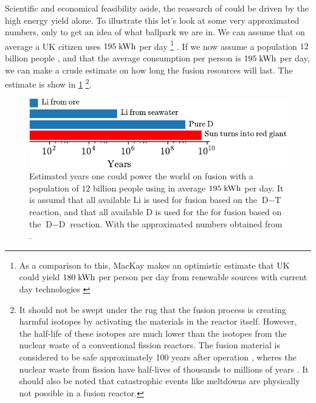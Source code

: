 Scientific and economical feasibility aside, the reasearch of could be driven by the high energy yield alone.
To illustrate this let's look at some very approximated numbers, only to get an idea of what ballpark we are in.
We can assume that on average a UK citizen uses $195 \text{\;kWh}$ per day%
\footnote{As a comparison to this, MacKay makes an optimistic estimate that UK could yield $180 \text{\;kWh}$ per person per day from renewable sources with current day technologies \cite{Mackay2009book}}%
%
\cite{Mackay2009book}.
If we now assume a population $12$ billion people \cite{Melorose2015}, and that the average consumption per person is $195 \text{\;kWh}$ per day, we can make a crude estimate on how long the fusion resources will last.
The estimate is show in \cref{fig:potFusion}%
%
\footnote{It should not be swept under the rug that the fusion process is creating harmful isotopes by activating the materials in the reactor itself.
    However, the half-life of these isotopes are much lower than the isotopes from the nuclear waste of a conventional fission reactors.
    The fusion material is considered to be safe approximately 100 years after operation \cite{Bloom1998}, wheres the nuclear waste from fission have half-lives of thousands to millions of years \cite{Kessler2012book}.
It should also be noted that catastrophic events like meltdowns are physically not possible in a fusion reactor.}.

\begin{figure}[htb]
    \begin{center}
        \includegraphics{fig/intro/fusionSustain}
    \end{center}
    \caption{Estimated years one could power the world on fusion with a population of $12$ billion people using in average $195 \text{\;kWh}$ per day.
        It is assumd that all available $\text{Li}$ is used for fusion based on the $\text{D}-\text{T}$ reaction, and that all available $\text{D}$ is used for the for fusion based on the $\text{D}-\text{D}$ reaction.
        With the approximated numbers obtained from \cite{Melorose2015,Mackay2009book,ongena2012,Eckhartt1995}.}
    \label{fig:potFusion}
\end{figure}
%

